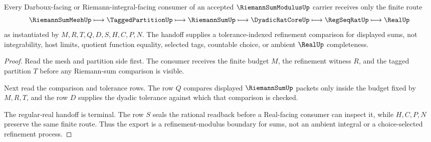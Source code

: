 \begin{theorem}
\label{thm:riemann-sum-modulus-consumer-handoff}
Every Darboux-facing or Riemann-integral-facing consumer of an accepted $\RiemannSumModulusUp$ carrier receives only the finite route
$$
\RiemannSumMeshUp \longmapsto \TaggedPartitionUp \longmapsto \RiemannSumUp \longmapsto \DyadicRatCoreUp \longmapsto \RegSeqRatUp \longmapsto \RealUp
$$
as instantiated by $M,R,T,Q,D,S,H,C,P,N$. The handoff supplies a tolerance-indexed refinement comparison for displayed sums, not integrability, host limits, quotient function equality, selected tags, countable choice, or ambient $\RealUp$ completeness.
\end{theorem}
\begin{proof}
Read the mesh and partition side first. The consumer receives the finite budget $M$, the refinement witness $R$, and the tagged partition $T$ before any Riemann-sum comparison is visible.

Next read the comparison and tolerance rows. The row $Q$ compares displayed $\RiemannSumUp$ packets only inside the budget fixed by $M,R,T$, and the row $D$ supplies the dyadic tolerance against which that comparison is checked.

The regular-real handoff is terminal. The row $S$ seals the rational readback before a Real-facing consumer can inspect it, while $H,C,P,N$ preserve the same finite route. Thus the export is a refinement-modulus boundary for sums, not an ambient integral or a choice-selected refinement process.
\end{proof}




